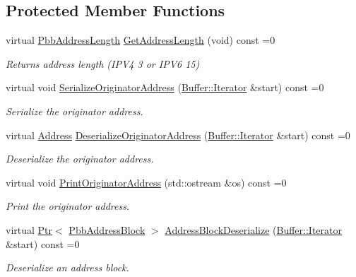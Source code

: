 \subsection*{Protected Member Functions}
\begin{DoxyCompactItemize}
\item 
virtual \hyperlink{namespacens3_a79988e6e8b09f64c6ffca894994cb033}{Pbb\+Address\+Length} \hyperlink{classns3_1_1PbbMessage_abc3011e4ca197ddc8ae7a9a1f18d779f}{Get\+Address\+Length} (void) const =0
\begin{DoxyCompactList}\small\item\em Returns address length (I\+P\+V4 3 or I\+P\+V6 15) \end{DoxyCompactList}\item 
virtual void \hyperlink{classns3_1_1PbbMessage_ab224036cc9b2318b2ec8c11b9e439dee}{Serialize\+Originator\+Address} (\hyperlink{classns3_1_1Buffer_1_1Iterator}{Buffer\+::\+Iterator} \&start) const =0
\begin{DoxyCompactList}\small\item\em Serialize the originator address. \end{DoxyCompactList}\item 
virtual \hyperlink{classns3_1_1Address}{Address} \hyperlink{classns3_1_1PbbMessage_a85737f440933ba629489ac464c990df6}{Deserialize\+Originator\+Address} (\hyperlink{classns3_1_1Buffer_1_1Iterator}{Buffer\+::\+Iterator} \&start) const =0
\begin{DoxyCompactList}\small\item\em Deserialize the originator address. \end{DoxyCompactList}\item 
virtual void \hyperlink{classns3_1_1PbbMessage_a71ae17a7cdc07aa1736f0e3b8fd20658}{Print\+Originator\+Address} (std\+::ostream \&os) const =0
\begin{DoxyCompactList}\small\item\em Print the originator address. \end{DoxyCompactList}\item 
virtual \hyperlink{classns3_1_1Ptr}{Ptr}$<$ \hyperlink{classns3_1_1PbbAddressBlock}{Pbb\+Address\+Block} $>$ \hyperlink{classns3_1_1PbbMessage_acb9c67d9575f1ecdd5d65a858018d636}{Address\+Block\+Deserialize} (\hyperlink{classns3_1_1Buffer_1_1Iterator}{Buffer\+::\+Iterator} \&start) const =0
\begin{DoxyCompactList}\small\item\em Deserialize an address block. \end{DoxyCompactList}\end{DoxyCompactItemize}
